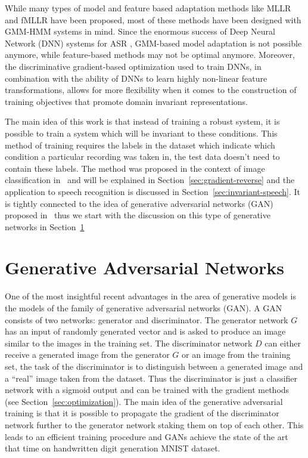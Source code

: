 \documentclass{article}
\begin{document}
    While many types of model and feature based adaptation methods like MLLR and fMLLR
    \cite{leggetter1995maximum} have been proposed, most of these methods have
    been designed with GMM-HMM systems in mind. Since the enormous success of
    Deep Neural Network (DNN) systems for ASR \cite{hinton2012deep}, GMM-based
    model adaptation is not possible anymore, while feature-based methods may
    not be optimal anymore.
    Moreover, the discriminative gradient-based optimization used to train
    DNNs, in combination with the ability of DNNs to learn highly non-linear
    feature transformations, allows for more flexibility when it comes to the
    construction of training objectives that promote domain invariant
    representations.

    The main idea of this work is that instead of training a robust system,
    it is possible to train a system which will be invariant to these 
    conditions. This method of training requires the labels in the dataset
    which indicate which condition a particular recording was taken in, the 
    test data doesn't need to contain these labels. The method was proposed in
    the context of image classification in~\cite{ganin2014unsupervised} and 
    will be explained in Section~\ref{sec:gradient-reverse} and the application 
    to speech recognition is discussed
    in Section~\ref{sec:invariant-speech}. It is tightly connected to the idea
    of generative adversarial networks (GAN) proposed 
    in~\cite{goodfellow2014generative} thus we start with the discussion
    on this type of generative networks in Section~\ref{sec:gans}


\section{Generative Adversarial Networks}
\label{sec:gans}
    One of the most insightful recent advantages in the area of generative models
    is the models of the family of generative adversarial networks (GAN).
    A GAN consists of two networks: generator and discriminator. The generator 
    network $G$ has an
    input of randomly generated vector and is asked to produce an image 
    similar to the images in the training set. The discriminator network $D$
    can either receive a generated image from the generator $G$ or an image
    from the training set, the task of the discriminator is to distinguish
    between a generated image and a ``real'' image taken from the dataset. Thus
    the discriminator is just a classifier network with a sigmoid output
    and can be trained with the gradient methods (see 
    Section~\ref{sec:optimization}). The main idea of the generative adversarial
    training is that it is possible to propagate the gradient of the discriminator
    network further to the generator network staking them on top of each other.
    This leads to an efficient training procedure and GANs achieve the state of the
    art that time on handwritten digit generation MNIST dataset.
\end{document}
